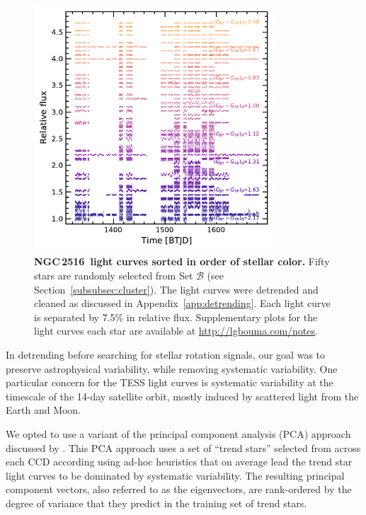 \documentclass[12pt,twocolumn,tighten]{aastex63}
\newcommand{\cn}{NGC\,2516} %
\begin{document}
\begin{figure}[b]
	\begin{center}
		\leavevmode
		\includegraphics[width=0.8\textwidth]{f14.pdf}
	\end{center}
	\vspace{-1cm}
  \caption{ {\bf \cn\ light curves sorted in order
  of stellar color.} Fifty stars are randomly selected from Set
  $\mathcal{B}$ (see Section~\ref{subsubsec:cluster}). The light
  curves were detrended and cleaned as discussed in
  Appendix~\ref{app:detrending}.  Each light curve is separated by
  7.5\% in relative flux.
  Supplementary plots for the light curves each star are available
  at \url{http://lgbouma.com/notes}.
  \label{fig:lightcurves}
	}
\end{figure}



In detrending before searching for stellar rotation signals, our goal
was to preserve astrophysical variability, while removing systematic
variability.  One particular concern for the TESS light curves is
systematic variability at the timescale of the 14-day satellite orbit,
mostly induced by scattered light from the Earth and Moon.

We opted to use a variant of the principal component analysis (PCA)
approach discussed by \citet{bouma_cdipsI_2019}. This PCA approach
uses a set of ``trend stars'' selected from across each CCD according
using ad-hoc heuristics that on average lead the trend star light
curves to be dominated by systematic variability.  The resulting
principal component vectors, also referred to as the eigenvectors, are
rank-ordered by the degree of variance that they predict in the
training set of trend stars.
\end{document}
